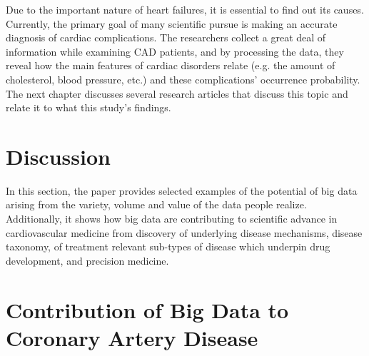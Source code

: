 \documentclass[sigconf]{acmart}
\begin{document}
Due to the important nature of heart failures, it is essential to find out its causes. Currently, the primary goal of many scientific pursue is making an accurate diagnosis of cardiac complications. The researchers collect a great deal of information while examining CAD patients, and by processing the data, they reveal how the main features of cardiac disorders relate (e.g. the amount of cholesterol, blood pressure, etc.) and these complications' occurrence probability. The next chapter discusses several research articles that discuss this topic and relate it to what this study's findings.

\section{Discussion}
In this section, the paper provides selected examples of the potential of big data arising from the variety, volume and value of the data people realize. Additionally, it shows how big data are contributing to scientific advance in cardiovascular medicine from discovery of underlying disease mechanisms, disease taxonomy, of treatment relevant sub-types of disease which underpin drug development, and precision medicine.

\section{Contribution of Big Data to Coronary Artery Disease}
\end{document}
